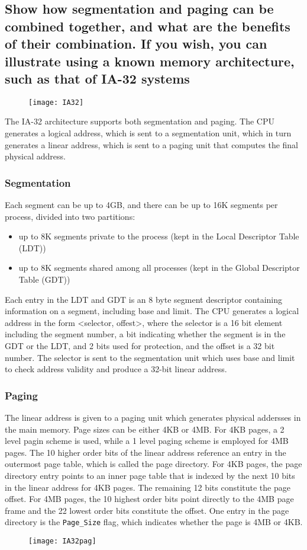 \documentclass{article}
\begin{document}
\subsection{Show how segmentation and paging can be combined together, and what are the benefits of their combination. If you wish, you can illustrate using a known memory architecture, such as that of IA-32 systems}
\begin{figure}[ht]
    \centering
    \texttt{[image: IA32]}
    \label{address translation in IA-32}
\end{figure}
The IA-32 architecture supports both segmentation and paging. The CPU generates a logical address, which is sent to a segmentation unit, which in turn generates a linear address, which is sent to a paging unit that computes the final physical address.


\subsubsection{Segmentation}
Each segment can be up to 4GB, and there can be up to 16K segments per process, divided into two partitions: \begin{itemize}
    \item up to 8K segments private to the process (kept in the Local Descriptor Table (LDT))
    \item up to 8K segments shared among all processes (kept in the Global Descriptor Table (GDT))
\end{itemize}
Each entry in the LDT and GDT is an 8 byte segment descriptor containing information on a segment, including base and limit. The CPU generates a logical address in the form <selector, offest>, where the selector is a 16 bit element including the segment number, a bit indicating whether the segment is in the GDT or the LDT, and 2 bits used for protection, and the offset is a 32 bit number. The selector is sent to the segmentation unit which uses base and limit to check address validity and produce a 32-bit linear address.
\subsubsection{Paging}
The linear address is given to a paging unit which generates physical addersses in the main memory. Page sizes can be either 4KB or 4MB. For 4KB pages, a 2 level pagin scheme is used, while a 1 level paging scheme is employed for 4MB pages. The 10 higher order bits of the linear address reference an entry in the outermost page table, which is called the page directory. For 4KB pages, the page directory entry points to an inner page table that is indexed by the next 10 bits in the linear address for 4KB pages. The remaining 12 bits constitute the page offset. For 4MB pages, the 10 highest order bits point directly to the 4MB page frame and the 22 lowest order bits constitute the offset. One entry in the page directory is the \verb|Page_Size| flag, which indicates whether the page is 4MB or 4KB.
\begin{figure}[h]
    \centering
    \texttt{[image: IA32pag]}
    \label{Paging in the IA-32 architecture}
\end{figure}
\end{document}

